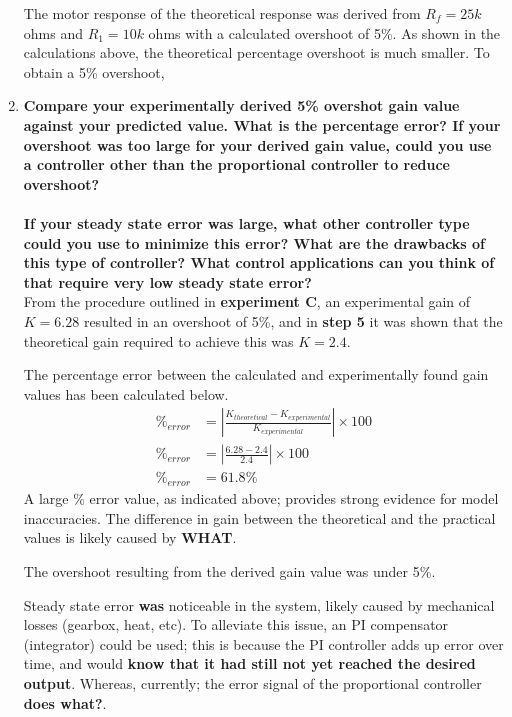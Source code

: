 \documentclass[11pt,a4paper]{article}
\begin{document}
\begin{enumerate}
	The motor response of the theoretical response was derived from $R_f = 25k$ ohms and $R_1 = 10k$ ohms with a calculated overshoot of 5\%. As shown in the calculations above, the theoretical percentage overshoot is much smaller. To obtain a 5\% overshoot, \\

    

    \pagebreak
	\item \textbf{Compare your experimentally derived 5\% overshot gain value against your predicted value. What is the percentage error? If your overshoot was too large for your derived gain value, could you use a controller other than the proportional controller to reduce overshoot? \\\\
If your steady state error was large, what other controller type could you use to minimize this error? What are  the drawbacks of  this  type of controller? What control applications can you think of that require very low steady state error?}\\

From the procedure outlined in \textbf{experiment C}, an experimental gain of $K = 6.28$ resulted in an overshoot of 5\%, and in \textbf{step 5} it was shown that the theoretical gain required to achieve this was $K = 2.4$.

The percentage error between the calculated and experimentally found gain values has been calculated below.
\begin{align*}
\%_{error} &= |\frac{K_{theoretical} - K_{experimental}}{K_{experimental}}| \times 100 \\
\%_{error} &= |\frac{6.28 - 2.4}{2.4}| \times 100 \\
\%_{error} &= 61.8\% 
\end{align*}
A large \% error value, as indicated above; provides strong evidence for model inaccuracies. The difference in gain between the theoretical and the practical values is likely caused by \textbf{WHAT}. 

The overshoot resulting from the derived gain value was under 5\%. 

Steady state error \textbf{was} noticeable in the system, likely caused by mechanical losses (gearbox, heat, etc). To alleviate this issue, an PI compensator (integrator) could be used; this is because the PI controller adds up error over time, and would \textbf{know that it had still not yet reached the desired output}. Whereas, currently; the error signal of the proportional controller \textbf{does what?}.


\end{enumerate}
\end{document}
